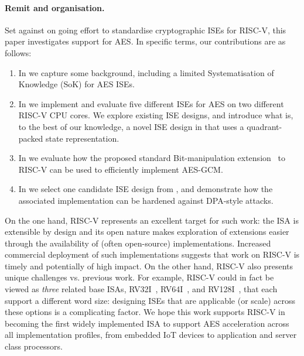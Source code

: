 
\paragraph{Remit and organisation.}

Set against on going effort to standardise cryptographic ISEs for RISC-V,
this paper investigates support for AES.
In specific terms, our contributions are as follows:

\begin{enumerate}

\item In 
      we capture some background, including a limited
      Systematisation of Knowledge (SoK)
      for AES ISEs.

\item In 
      we implement and evaluate five different ISEs for AES on two different 
      RISC-V CPU cores.
      We explore existing ISE designs, 
      and introduce what is, to the best of our knowledge, a novel ISE design
      in  
      that uses a quadrant-packed state representation.

\item In
      we evaluate how the
      proposed standard 
      Bit-manipulation
      extension~\cite[Section 21]{RV:ISA:I:19}
      to RISC-V can be used to efficiently implement AES-GCM.

\item In
      we select one candidate ISE design from 
      ,
      and demonstrate how the associated implementation can be hardened
      against DPA-style attacks.

\end{enumerate}

\noindent
On the one hand, 
RISC-V represents an excellent target for such work:
the ISA is extensible by design and its open nature makes
exploration of extensions easier through the availability of
(often open-source) implementations.  
Increased commercial deployment of such implementations suggests that work 
on RISC-V is timely and potentially of high impact.
On the other hand, RISC-V also presents unique challenges vs. previous work.
For example,
RISC-V could in fact be viewed as {\em three} related base ISAs,
 RV32I~\cite[Section 2]{RV:ISA:I:19},
 RV64I~\cite[Section 5]{RV:ISA:I:19},
and
RV128I~\cite[Section 6]{RV:ISA:I:19},
that each support a different word size:
designing ISEs that are applicable (or scale) across these options is a
complicating factor.
We hope this work supports RISC-V in becoming the
first widely implemented ISA to support AES acceleration across
all implementation profiles, from embedded IoT devices to application
and server class processors.

%

